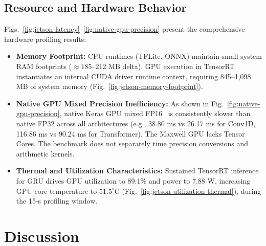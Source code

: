 \documentclass[11pt,a4paper]{article}
\begin{document}
\subsection{Resource and Hardware Behavior}
Figs.~\ref{fig:jetson-latency}--\ref{fig:native-gpu-precision} present the comprehensive hardware profiling results:
\begin{itemize}
    \item \textbf{Memory Footprint:} CPU runtimes (TFLite, ONNX) maintain small system RAM footprints ($\approx 185$--$212\text{ MB}$ delta). GPU execution in TensorRT instantiates an internal CUDA driver runtime context, requiring 845--1,098 MB of system memory (Fig.~\ref{fig:jetson-memory-footprint}).
    \item \textbf{Native GPU Mixed Precision Inefficiency:} As shown in Fig.~\ref{fig:native-gpu-precision}, native Keras GPU mixed FP16~\cite{micikevicius2018mixed} is consistently slower than native FP32 across all architectures (e.g., 38.80 ms vs 26.17 ms for Conv1D, 116.86 ms vs 90.24 ms for Transformer). The Maxwell GPU lacks Tensor Cores. The benchmark does not separately time precision conversions and arithmetic kernels.
    \item \textbf{Thermal and Utilization Characteristics:} Sustained TensorRT inference for GRU drives GPU utilization to 89.1\% and power to 7.88 W, increasing GPU core temperature to $51.5^\circ\text{C}$ (Fig.~\ref{fig:jetson-utilization-thermal}), during the 15-s profiling window.
\end{itemize}

\section{Discussion}
\label{sec:discussion}
\end{document}
